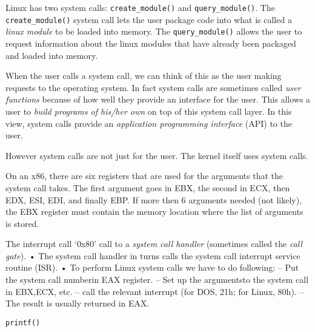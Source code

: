 \begin{example}
Linux has two system calls: \lstinline{create_module()} and \lstinline{query_module()}.
The \lstinline{create_module()} system call lets the user package code into
what is called a \textit{linux module} to be loaded into memory.
The \lstinline{query_module()} allows the user to request information about 
the linux modules that have already been packaged and loaded into memory.
\end{example}



When the user calls a system call, we can think of this as the user making 
requests to the operating system. In fact system calls are sometimes called
\textit{user functions} because of how well they provide an interface for the user. 
This allows a user to \textit{build programs of his/her own} on top of this system call layer. 
In this view, system calls provide an \textit{application programming interface} (API) 
to the user.


However system calls are not just for the user. The kernel itself 
uses system calls. 

\frmrule

On an x86, there are six registers that are used for the arguments that
the system call takes. The first argument goes in EBX, the
second in ECX, then EDX, ESI, EDI, and finally EBP. If
more then 6 arguments needed (not likely), the EBX
register must contain the memory location where the list of arguments is stored.

The interrupt call ‘0x80’ call to a \textit{system call handler} (sometimes
called the \textit{call gate}).
• The system call handler in turns calls the system call interrupt
service routine (ISR).
• To perform Linux system calls we have to do following:
– Put the system call numberin EAX register.
– Set up the argumentsto the system call in EBX,ECX, etc.
– call the relevant interrupt (for DOS, 21h; for Linux,
80h).
– The result is usually returned in EAX.


\begin{example}

\begin{lstlisting}
printf()
\end{lstlisting}
\end{example}





